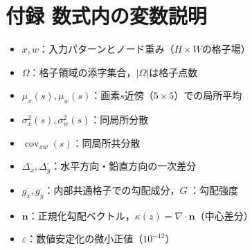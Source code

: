 \documentclass{jarticle}
\theoremstyle{definition}
\begin{document}
\section*{付録 数式内の変数説明}
\begin{itemize}
\item $x,w$：入力パターンとノード重み（$H\times W$の格子場）
\item $\Omega$：格子領域の添字集合，$|\Omega|$は格子点数
\item $\mu_x(s),\mu_w(s)$：画素$s$近傍（$5\times 5$）での局所平均
\item $\sigma_x^2(s),\sigma_w^2(s)$：同局所分散
\item $\operatorname{cov}_{xw}(s)$：同局所共分散
\item $\Delta_x^\cdot,\Delta_y^\cdot$：水平方向・鉛直方向の一次差分
\item $g_x^\cdot,g_y^\cdot$：内部共通格子での勾配成分，$G^\cdot$：勾配強度
\item $\bm{n}$：正規化勾配ベクトル，$\kappa(z)=\nabla\cdot\bm{n}$（中心差分）
\item $\varepsilon$：数値安定化の微小正値（$10^{-12}$）
\end{itemize}



\end{document}
